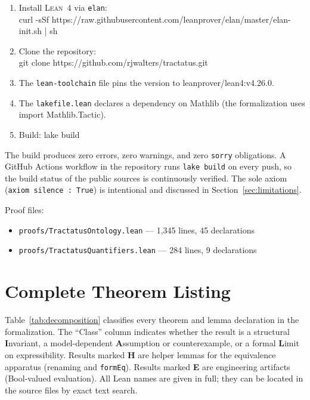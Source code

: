 \documentclass[10pt, letterpaper]{article}
\theoremstyle{definition}
\theoremstyle{remark}
\newcommand{\Lean}{\textsc{Lean}}
\begin{document}
\begin{enumerate}[nosep]
  \item Install \Lean~4 via \texttt{elan}:\\
    {\small\ttfamily curl -sSf https://raw.githubusercontent.com/\allowbreak{}leanprover/\allowbreak{}elan/\allowbreak{}master/\allowbreak{}elan-init.sh | sh}
  \item Clone the repository:\\
    {\small\ttfamily git clone https://github.com/rjwalters/tractatus.git}
  \item The \texttt{lean-toolchain} file pins the version to
    {\small\ttfamily leanprover/lean4:v4.26.0}.
  \item The \texttt{lakefile.lean} declares a dependency on
    Mathlib (the formalization uses
    {\small\ttfamily import Mathlib.Tactic}).
  \item Build: {\small\ttfamily lake build}
\end{enumerate}

\noindent
The build produces zero errors, zero warnings, and zero
\texttt{sorry} obligations.  A GitHub Actions workflow in the
repository runs \texttt{lake build} on every push, so the build
status of the public sources is continuously verified.  The sole axiom
(\texttt{axiom silence : True}) is intentional and
discussed in Section~\ref{sec:limitations}.

Proof files:
\begin{itemize}[nosep]
  \item \texttt{proofs/TractatusOntology.lean} --- 1,345 lines, 45 declarations
  \item \texttt{proofs/TractatusQuantifiers.lean} --- 284 lines, 9 declarations
\end{itemize}

\section{Complete Theorem Listing}
\label{app:theorems}

Table~\ref{tab:decomposition} classifies every theorem and lemma
declaration in the formalization.  The ``Class'' column indicates
whether the result is a structural \textbf{I}nvariant,
a model-dependent \textbf{A}ssumption or counterexample, or a
formal \textbf{L}imit on expressibility.  Results marked
\textbf{H} are helper lemmas for the equivalence apparatus
(renaming and \texttt{formEq}).
Results marked \textbf{E} are engineering artifacts
(Bool-valued evaluation).  All Lean names are given in full;
they can be located in the source files by exact text search.
\end{document}
